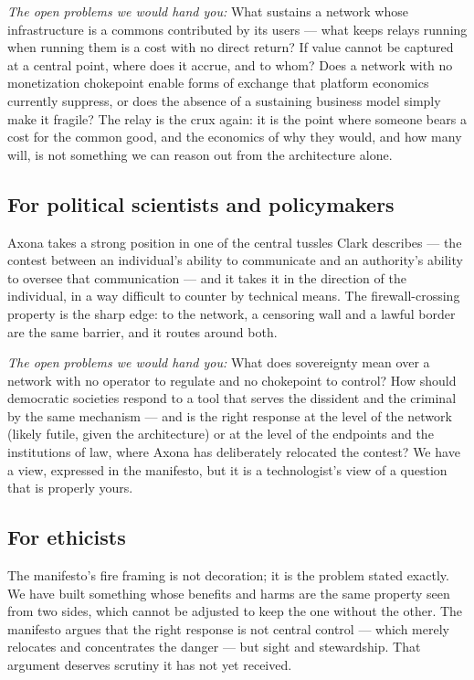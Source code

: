 \documentclass[nobib,justified]{tufte-handout}
\begin{document}
\emph{The open problems we would hand you:} What sustains a network whose
infrastructure is a commons contributed by its users --- what keeps relays running
when running them is a cost with no direct return? If value cannot be captured at a
central point, where does it accrue, and to whom? Does a network with no
monetization chokepoint enable forms of exchange that platform economics currently
suppress, or does the absence of a sustaining business model simply make it
fragile? The relay is the crux again: it is the point where someone bears a cost
for the common good, and the economics of why they would, and how many will, is not
something we can reason out from the architecture alone.

\subsection{For political scientists and policymakers}

Axona takes a strong position in one of the central tussles Clark describes ---
the contest between an individual's ability to communicate and an authority's
ability to oversee that communication --- and it takes it in the direction of the
individual, in a way difficult to counter by technical means. The firewall-crossing
property is the sharp edge: to the network, a censoring wall and a lawful border
are the same barrier, and it routes around both.

\emph{The open problems we would hand you:} What does sovereignty mean over a
network with no operator to regulate and no chokepoint to control? How should
democratic societies respond to a tool that serves the dissident and the criminal
by the same mechanism --- and is the right response at the level of the network
(likely futile, given the architecture) or at the level of the endpoints and the
institutions of law, where Axona has deliberately relocated the contest? We have a
view, expressed in the manifesto, but it is a technologist's view of a question
that is properly yours.

\subsection{For ethicists}

The manifesto's fire framing is not decoration; it is the problem stated exactly. We have built something whose benefits and harms are the same property
seen from two sides, which cannot be adjusted to keep the one without the other.
The manifesto argues that the right response is not central control --- which
merely relocates and concentrates the danger --- but sight and stewardship. That
argument deserves scrutiny it has not yet received.
\end{document}
